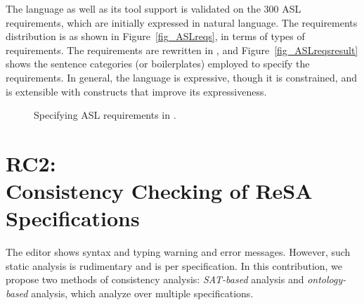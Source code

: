 The language as well as its tool support is validated on the 300 ASL requirements, which are initially expressed in natural language. The requirements distribution is as shown in Figure~\ref{fig_ASLreqs}, in terms of types of requirements. The requirements are rewritten in \resa, and Figure~\ref{fig_ASLreqsresult} shows the sentence categories (or boilerplates) employed to specify the requirements. In general, the language is expressive, though it is constrained, and is extensible with constructs that improve its expressiveness.
 \begin{figure}[h] 
 	\centering
 	 \hfill
 	\caption{Specifying ASL requirements in \resa.} \label{fig_resa_asl}
 \end{figure}
\section[RC2: Consistency~Checking of {\sffamily ReSA}~Specifications]{RC2: \\Consistency Checking of {\sffamily ReSA} Specifications}\label{rc_resaanalysis}
The editor shows syntax and typing warning and error messages. However, such static analysis is rudimentary and is per specification. In this contribution, we propose two methods of consistency analysis: \textit{SAT-based} analysis and \textit{ontology-based} analysis, which analyze over multiple specifications.

